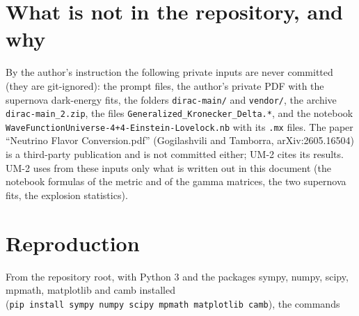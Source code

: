 \documentclass[
  10pt,
]{article}
\begin{document}
\hypertarget{what-is-not-in-the-repository-and-why}{%
\section{What is not in the repository, and
why}\label{what-is-not-in-the-repository-and-why}}

By the author's instruction the following private inputs are never
committed (they are git-ignored): the prompt files, the author's private
PDF with the supernova dark-energy fits, the folders
\texttt{dirac-main/} and \texttt{vendor/}, the archive
\texttt{dirac-main\_2.zip}, the files
\texttt{Generalized\_Kronecker\_Delta.*}, and the notebook
\texttt{WaveFunctionUniverse-4+4-Einstein-Lovelock.nb} with its
\texttt{.mx} files. The paper ``Neutrino Flavor Conversion.pdf''
(Gogilashvili and Tamborra, arXiv:2605.16504) is a third-party
publication and is not committed either; UM-2 cites its results. UM-2
uses from these inputs only what is written out in this document (the
notebook formulas of the metric and of the gamma matrices, the two
supernova fits, the explosion statistics).

\hypertarget{reproduction}{%
\section{Reproduction}\label{reproduction}}

From the repository root, with Python 3 and the packages sympy, numpy,
scipy, mpmath, matplotlib and camb installed
(\texttt{pip\ install\ sympy\ numpy\ scipy\ mpmath\ matplotlib\ camb}),
the commands
\end{document}
